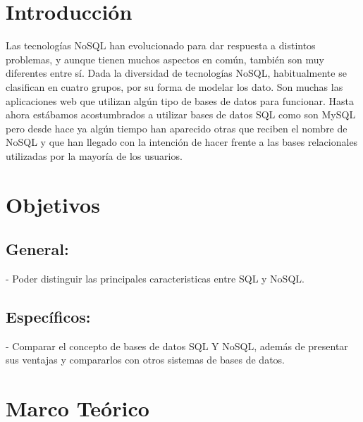 \documentclass[%
 reprint,
 amsmath,amssymb,
 aps,
]{revtex4-1}
\begin{document}

\section {Introducción}\label{sec:1}
Las tecnologías NoSQL han evolucionado para dar respuesta a distintos problemas, y aunque tienen muchos aspectos en común, también son muy diferentes entre sí. Dada la diversidad de tecnologías NoSQL, habitualmente se clasifican en cuatro grupos, por su forma de modelar los dato.
Son muchas las aplicaciones web que utilizan algún tipo de bases de datos para funcionar. Hasta ahora estábamos acostumbrados a utilizar bases de datos SQL como son MySQL pero desde hace ya algún tiempo han aparecido otras que reciben el nombre de NoSQL  y que han llegado con la intención de hacer frente a las bases relacionales utilizadas por la mayoría de los usuarios.



\section{Objetivos}\label{sec:2}
\subsection{General:}
-  Poder distinguir las principales caracteristicas  entre  SQL y  NoSQL.
\subsection{Específicos:}
-  Comparar el concepto de bases de datos SQL Y  NoSQL, además de presentar sus ventajas y compararlos con otros sistemas de bases de datos.


\section {Marco Teórico}\label{sec:3}
\end{document}
